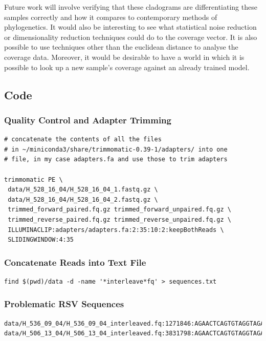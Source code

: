 \documentclass[10pt, a4paper]{article}
\begin{document}
Future work will involve verifying that these cladograms are differentiating
these samples correctly and how it compares to contemporary methods of
phylogenetics.
It would also be interesting to see what statistical noise reduction or
dimensionality reduction techniques could do to the coverage vector.
It is also possible to use techniques other than the euclidean distance to
analyse the coverage data. Moreover, it would be desirable to have a world in
which it is possible to look up a new sample's coverage against an already
trained model.

\newpage



\begin{appendices}
\subsection{Code}
\label{sec:org5bddd28}

\subsubsection{Quality Control and Adapter Trimming}
\label{sec:org6faa558}
\begin{verbatim}
# concatenate the contents of all the files
# in ~/miniconda3/share/trimmomatic-0.39-1/adapters/ into one
# file, in my case adapters.fa and use those to trim adapters

trimmomatic PE \
 data/H_528_16_04/H_528_16_04_1.fastq.gz \
 data/H_528_16_04/H_528_16_04_2.fastq.gz \
 trimmed_forward_paired.fq.gz trimmed_forward_unpaired.fq.gz \
 trimmed_reverse_paired.fq.gz trimmed_reverse_unpaired.fq.gz \
 ILLUMINACLIP:adapters/adapters.fa:2:35:10:2:keepBothReads \
 SLIDINGWINDOW:4:35
\end{verbatim}

\subsubsection{Concatenate Reads into Text File}
\label{sec:org782f498}
\begin{verbatim}
find $(pwd)/data -d -name '*interleave*fq' > sequences.txt
\end{verbatim}

\subsubsection{Problematic RSV Sequences}
\label{sec:orgd409f8e}
\begin{verbatim}
data/H_536_09_04/H_536_09_04_interleaved.fq:1271846:AGAACTCAGTGTAGGTAGAATGGTTGGCTGATCAATATCTCTAATGATTTTGGTCTGTGAATCAACTGTCATAAGAGAATTCTATCAAAGTTGAATTCCGAATCCTTGGGTCAATGACTGGGTGCACCCATTCTTCTAATGTGCTCTGTC
data/H_506_13_04/H_506_13_04_interleaved.fq:3831798:AGAACTCAGTGTAGGTAGAATGGTTGGCTGAGTAGGTAGATGGAGGCAGGTGCATGTGTGATGGGAAGTGTGGTGACGGGTTGTGTGGGCACACGGGATGAGGCGCAGATGGCTGGGGGTTTGGGAGGGGAATGGGTGGGAGAAGGAGGC
\end{verbatim}


\end{appendices}
\end{document}
